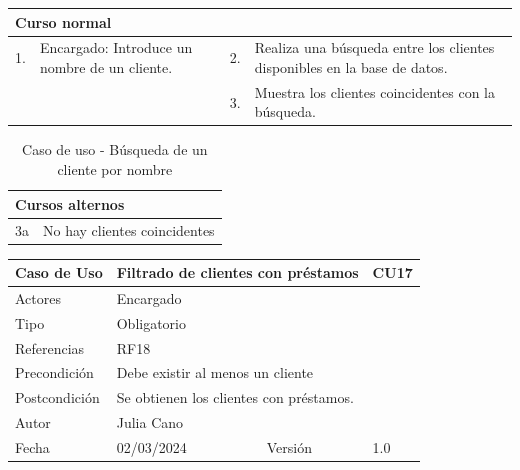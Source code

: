 \begin{table}[H]
	\centering
	\begin{tabular}{| m{} | m{} | m{} | m{} |}
		\hline
		\multicolumn{4}{|m{0.9\textwidth}|}{Curso normal}     \\ 
		\hline
		1. & Encargado: Introduce un nombre de un cliente. & 2. &  Realiza una búsqueda entre los clientes disponibles en la base de datos.  \\ 
		\hline
		 &  & 3. &  Muestra los clientes coincidentes con la búsqueda.  \\ 
		\hline
	\end{tabular}
\end{table}

\begin{table}[H]
	\centering
	\begin{tabular}{| m{} | m{} | m{} | m{} |}
		\hline
		\multicolumn{4}{|m{0.9\textwidth}|}{Cursos alternos}     \\ 
		\hline
		3a & \multicolumn{3}{m{0.67\textwidth}|}{No hay clientes coincidentes} \\ 
		\hline
	\end{tabular}
	\caption{Caso de uso - Búsqueda de un cliente por nombre}
\end{table}

\newpage


\begin{table}[H]
	\centering
	\begin{tabular}{| m{} | m{} | m{} | m{}|}
		\hline
		\rowcolor{grayshade} Caso de Uso & \multicolumn{2}{|m{0.43\textwidth}|}{Filtrado de clientes con préstamos} &  CU17\\ 
		\hline
		Actores & \multicolumn{3}{l|}{Encargado} \\ 
		\hline
		Tipo & \multicolumn{3}{l|}{Obligatorio} \\ 
		\hline
		Referencias & \multicolumn{3}{l|}{RF18} \\ 
		\hline
		Precondición & \multicolumn{3}{m{0.67\textwidth}|}{Debe existir al menos un cliente} \\ 
		\hline
		Postcondición & \multicolumn{3}{m{0.67\textwidth}|}{Se obtienen los clientes con préstamos.} \\ 
		\hline
		Autor & \multicolumn{3}{l|}{Julia Cano} \\ 
		\hline
		Fecha & 02/03/2024 & Versión & 1.0 \\
		\hline
	\end{tabular}
\end{table}

